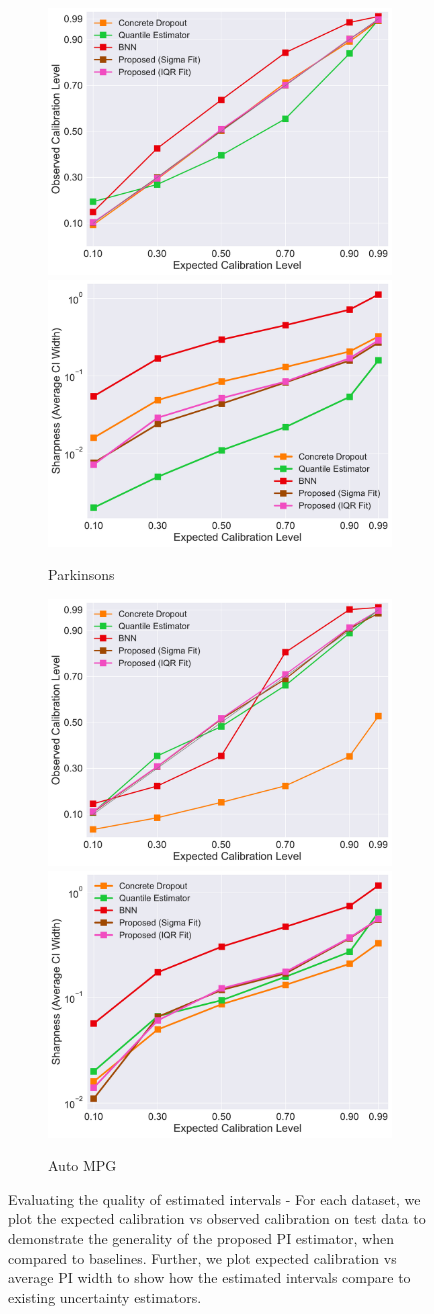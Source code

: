 \documentclass[letterpaper]{article} %
\begin{document}
\begin{figure}[t]
    \vfill
    
    \begin{subfigure}[b]{0.48\textwidth}
	        \centering
			\includegraphics[width=0.48\linewidth, keepaspectratio=true]{parkinsons.pdf}
			\includegraphics[width=0.48\linewidth, keepaspectratio=true]{parkinsons-cvsws.pdf}
		\caption{Parkinsons}
	    \label{fig:parkinsons}		
    \end{subfigure}
    \begin{subfigure}[b]{0.48\textwidth}
	        \centering
			\includegraphics[width=0.48\linewidth, keepaspectratio=true]{autompg.pdf}
			\includegraphics[width=0.48\linewidth, keepaspectratio=true]{autompg-cvsws.pdf}
		\caption{Auto MPG}
	    \label{fig:autompg}		
    \end{subfigure}
	\caption{Evaluating the quality of estimated intervals - For each dataset, we plot the expected calibration vs observed calibration on test data to demonstrate the generality of the proposed PI estimator, when compared to baselines. Further, we plot expected calibration vs average PI width to show how the estimated intervals compare to existing uncertainty estimators.}
	\label{fig:regression}
\end{figure}
\end{document}
